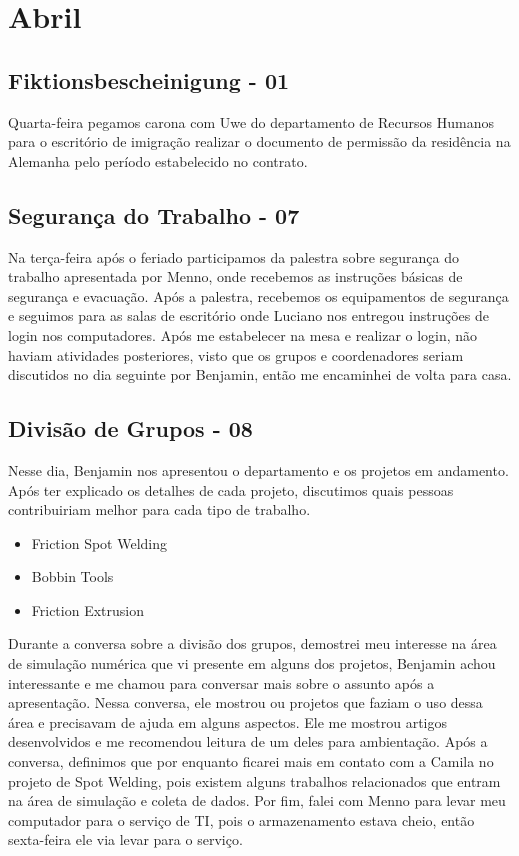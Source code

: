 \chapter{Abril}

\section{Fiktionsbescheinigung - 01}
Quarta-feira pegamos carona com Uwe do departamento de Recursos Humanos para o escritório de imigração realizar o documento de permissão da residência na Alemanha pelo período estabelecido no contrato.

\section{Segurança do Trabalho - 07}
Na terça-feira após o feriado participamos da palestra sobre segurança do trabalho apresentada por Menno, onde recebemos as instruções básicas de segurança e evacuação. Após a palestra, recebemos os equipamentos de segurança e seguimos para as salas de escritório onde Luciano nos entregou instruções de login nos computadores. Após me estabelecer na mesa e realizar o login, não haviam atividades posteriores, visto que os grupos e coordenadores seriam discutidos no dia seguinte por Benjamin, então me encaminhei de volta para casa.

\section{Divisão de Grupos - 08}
Nesse dia, Benjamin nos apresentou o departamento e os projetos em andamento. Após ter explicado os detalhes de cada projeto, discutimos quais pessoas contribuiriam melhor para cada tipo de trabalho. 

\begin{itemize}
	\item Friction Spot Welding
	\item Bobbin Tools
	\item Friction Extrusion
\end{itemize}

Durante a conversa sobre a divisão dos grupos, demostrei meu interesse na área de simulação numérica que vi presente em alguns dos projetos, Benjamin achou interessante e me chamou para conversar mais sobre o assunto após a apresentação. Nessa conversa, ele mostrou ou projetos que faziam o uso dessa área e precisavam de ajuda em alguns aspectos. Ele me mostrou artigos desenvolvidos e me recomendou leitura de um deles para ambientação. Após a conversa, definimos que por enquanto ficarei mais em contato com a Camila no projeto de Spot Welding, pois existem alguns trabalhos relacionados que entram na área de simulação e coleta de dados. Por fim, falei com Menno para levar meu computador para o serviço de TI, pois o armazenamento estava cheio, então sexta-feira ele via levar para o serviço.

